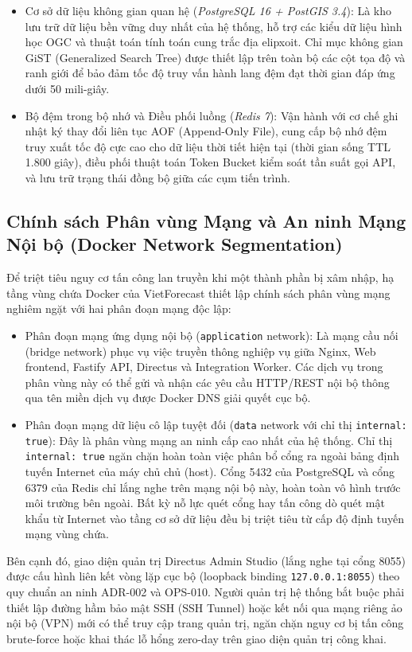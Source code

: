 \begin{itemize}
    \item[-] Cơ sở dữ liệu không gian quan hệ (\textit{PostgreSQL 16 + PostGIS 3.4}): Là kho lưu trữ dữ liệu bền vững duy nhất của hệ thống, hỗ trợ các kiểu dữ liệu hình học OGC và thuật toán tính toán cung trắc địa elipxoit. Chỉ mục không gian GiST (Generalized Search Tree) được thiết lập trên toàn bộ các cột tọa độ và ranh giới để bảo đảm tốc độ truy vấn hành lang đệm đạt thời gian đáp ứng dưới 50 mili-giây.
    \item[-] Bộ đệm trong bộ nhớ và Điều phối luồng (\textit{Redis 7}): Vận hành với cơ chế ghi nhật ký thay đổi liên tục AOF (Append-Only File), cung cấp bộ nhớ đệm truy xuất tốc độ cực cao cho dữ liệu thời tiết hiện tại (thời gian sống TTL 1.800 giây), điều phối thuật toán Token Bucket kiểm soát tần suất gọi API, và lưu trữ trạng thái đồng bộ giữa các cụm tiến trình.
\end{itemize}

\subsection{Chính sách Phân vùng Mạng và An ninh Mạng Nội bộ (Docker Network Segmentation)}
Để triệt tiêu nguy cơ tấn công lan truyền khi một thành phần bị xâm nhập, hạ tầng vùng chứa Docker của VietForecast thiết lập chính sách phân vùng mạng nghiêm ngặt với hai phân đoạn mạng độc lập:
\begin{itemize}
    \item[-] Phân đoạn mạng ứng dụng nội bộ (\texttt{application} network): Là mạng cầu nối (bridge network) phục vụ việc truyền thông nghiệp vụ giữa Nginx, Web frontend, Fastify API, Directus và Integration Worker. Các dịch vụ trong phân vùng này có thể gửi và nhận các yêu cầu HTTP/REST nội bộ thông qua tên miền dịch vụ được Docker DNS giải quyết cục bộ.
    \item[-] Phân đoạn mạng dữ liệu cô lập tuyệt đối (\texttt{data} network với chỉ thị \texttt{internal: true}): Đây là phân vùng mạng an ninh cấp cao nhất của hệ thống. Chỉ thị \texttt{internal: true} ngăn chặn hoàn toàn việc phân bổ cổng ra ngoài bảng định tuyến Internet của máy chủ chủ (host). Cổng 5432 của PostgreSQL và cổng 6379 của Redis chỉ lắng nghe trên mạng nội bộ này, hoàn toàn vô hình trước môi trường bên ngoài. Bất kỳ nỗ lực quét cổng hay tấn công dò quét mật khẩu từ Internet vào tầng cơ sở dữ liệu đều bị triệt tiêu từ cấp độ định tuyến mạng vùng chứa.
\end{itemize}

Bên cạnh đó, giao diện quản trị Directus Admin Studio (lắng nghe tại cổng 8055) được cấu hình liên kết vòng lặp cục bộ (loopback binding \texttt{127.0.0.1:8055}) theo quy chuẩn an ninh ADR-002 và OPS-010. Người quản trị hệ thống bắt buộc phải thiết lập đường hầm bảo mật SSH (SSH Tunnel) hoặc kết nối qua mạng riêng ảo nội bộ (VPN) mới có thể truy cập trang quản trị, ngăn chặn nguy cơ bị tấn công brute-force hoặc khai thác lỗ hổng zero-day trên giao diện quản trị công khai.

